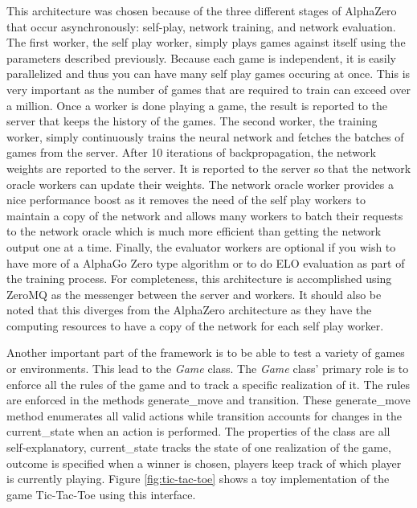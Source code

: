\documentclass{article}
\begin{document}
  This architecture was chosen because of the three different stages of AlphaZero that occur asynchronously: self-play, network training, and network evaluation. The first worker, the self play worker, simply plays games against itself using the parameters described previously. Because each game is independent, it is easily parallelized and thus you can have many self play games occuring at once. This is very important as the number of games that are required to train can exceed over a million. Once a worker is done playing a game, the result is reported to the server that keeps the history of the games. The second worker, the training worker, simply continuously trains the neural network and fetches the batches of games from the server. After 10 iterations of backpropagation, the network weights are reported to the server. It is reported to the server so that the network oracle workers can update their weights. The network oracle worker provides a nice performance boost as it removes the need of the self play workers to maintain a copy of the network and allows many workers to batch their requests to the network oracle which is much more efficient than getting the network output one at a time. Finally, the evaluator workers are optional if you wish to have more of a AlphaGo Zero type algorithm or to do ELO evaluation as part of the training process. For completeness, this architecture is accomplished using ZeroMQ as the messenger between the server and workers. It should also be noted that this diverges from the AlphaZero architecture as they have the computing resources to have a copy of the network for each self play worker.

  Another important part of the framework is to be able to test a variety of games or environments. This lead to the \textit{Game} class. The \textit{Game} class' primary role is to enforce all the rules of the game and to track a specific realization of it. The rules are enforced in the methods generate\_move and transition. These generate\_move method enumerates all valid actions while transition accounts for changes in the current\_state when an action is performed. The properties of the class are all self-explanatory, current\_state tracks the state of one realization of the game, outcome is specified when a winner is chosen, players keep track of which player is currently playing. Figure \ref{fig:tic-tac-toe} shows a toy implementation of the game Tic-Tac-Toe using this interface.
\end{document}
